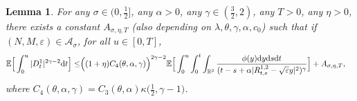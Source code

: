 \documentclass[11pt]{article}
\newtheorem{lemma}[theorem]{Lemma}
\newcommand{\E}{\mathbb{E}}
\newcommand{\R}{\mathbb{R}}
\newcommand{\1}{\mathbbm{1}}
\newcommand{\dd}{{\rm d}}
\newcommand{\Aa}{\mathcal A}
\newcommand{\e}{\varepsilon}
\begin{document}
\begin{lemma}\label{nest}
For any $\sigma \in (0,\frac 12]$, any $\alpha>0$, any $\gamma \in (\frac 32,2)$, any $T>0$, any $\eta>0$,
there exists a constant $A_{\sigma,\eta,T}$ (also depending on $\lambda,\theta,\gamma,\alpha,c_0$) such that 
if $(N,M,\e)\in \Aa_\sigma$, for all $u\in [0,T]$,
\begin{align*}
\E\Big[\int_0^u |D^1_t|^{2\gamma-2} \dd t \Big] \leq &
\Big((1+\eta)C_4(\theta,\alpha,\gamma)\Big)^{2\gamma-2}
\E\Big[\int_0^u \int_0^t \int_{\R^2} \frac{\phi(y) \dd y\dd s\dd t}{(t-s+\alpha|R^{1,2}_{t,s}-\sqrt \e y|^2)^{\gamma}}\Big]
+ A_{\sigma,\eta,T},
\end{align*}
where $C_4(\theta,\alpha,\gamma)=C_3(\theta,\alpha)\kappa(\frac{1}{2}, \gamma-1\big)$.
\end{lemma}
\end{document}
